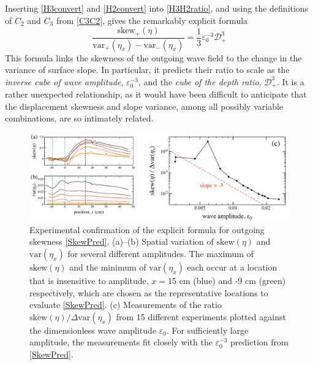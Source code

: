 \documentclass[11pt]{article}
\newcommand{\eps}{\varepsilon}
\newcommand{\etastd}{\eta_{\text std}}
\newcommand{\depth}{d}
\newcommand{\ddn}{\depth_{+}}
\newcommand{\drat}{\mathcal{D}}
\newcommand{\dratdn}{\drat_+}
\newcommand{\skw}{\text{skew}}
\newcommand{\skwdn}{\skw_+}
\newcommand{\var}{\text{var}}
\newcommand{\varup}{\var_-}
\newcommand{\vardn}{\var_+}
\newcommand{\epsup}{\eps_0}
\begin{document}
Inserting \eqref{H3convert} and \eqref{H2convert} into \eqref{H3H2ratio}, and using the definitions of $C_2$ and $C_3$ from \eqref{C3C2}, gives the remarkably explicit formula
\begin{equation}
\label{SkewPred}
\frac{\skwdn(\eta)} {\vardn(\eta_x) - \varup(\eta_x)} = \frac{1}{3} \epsup^{-3} \dratdn^3 
\end{equation}
This formula links the skewness of the outgoing wave field to the change in the variance of surface slope. In particular, it predicts their ratio to scale as the {\em inverse cube of wave amplitude}, $\epsup^{-3}$, and the {\em cube of the depth ratio}, $\dratdn^3$. It is a rather unexpected relationship, as it would have been difficult to anticipate that the displacement skewness and slope variance, among all possibly variable combinations, are so intimately related.
 
\begin{figure}%
\begin{center}
\includegraphics[width = 0.99 \linewidth]{Figs/SkewRat.pdf}
\caption{
Experimental confirmation of the explicit formula for outgoing skewness \eqref{SkewPred}.
(a)--(b) Spatial variation of $\skw(\eta)$ and $\var(\eta_x)$ for several different amplitudes. The maximum of $\skw(\eta)$ and the minimum of $\var(\eta_x)$ each occur at a location that is insensitive to amplitude, $x = $15 cm (blue) and -9 cm (green) respectively, which are chosen as the representative locations to evaluate \eqref{SkewPred}.
(c) Measurements of the ratio $\skw(\eta) / \Delta \var(\eta_x)$ from 15 different experiments plotted against the dimensionless wave amplitude $\epsup$. For sufficiently large amplitude, the measurements fit closely with the $\epsup^{-3}$ prediction from \eqref{SkewPred}.
}
\label{SkewRat}
\end{center}
\end{figure}
 
\end{document}
